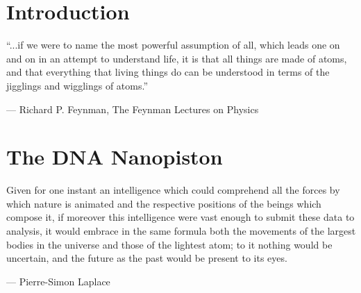 \documentclass[11pt,a4paper,twoside]{vutinfth}
\begin{document}

\newcommand\mycommfont[1]{\small\ttfamily\textcolor{blue}{#1}}

\frontmatter
\rmfamily

 \cleardoublepage
 \cleardoublepage
\setcounter{page}{0}

\cleardoublepage
 \cleardoublepage
\printglossaries \cleardoublepage
\listoffigures \cleardoublepage
\listoftables \cleardoublepage
\linespread{0.9}
{\small \tableofcontents}
\cleardoublepage
\linespread{1}

\mainmatter
\setcounter{page}{0}

\chapter{Introduction}
\vspace{-1cm}
\epigraphfontsize{\small\itshape}
\epigraph{“...if we were to name the most powerful assumption of all, which leads one on
and on in an attempt to understand life, it is that all things are made of atoms, and
that everything that living things do can be understood in terms of the jigglings and
wigglings of atoms.”}
{--- \textup{Richard P. Feynman}, The Feynman Lectures on Physics\cite{feynmanLectures}}






\cleardoublepage

\chapter{The DNA Nanopiston}
\vspace{-1cm}
\epigraph{Given for one instant an intelligence which could comprehend all
the forces by which nature is animated and the respective positions
of the beings which compose it, if moreover this intelligence were vast
enough to submit these data to analysis, it would embrace in the same
formula both the movements of the largest bodies in the universe and
those of the lightest atom; to it nothing would be uncertain, and the
future as the past would be present to its eyes.}
{--- \textup{Pierre-Simon Laplace}}



\end{document}
